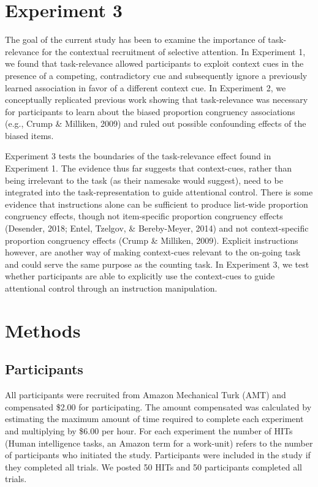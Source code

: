 \documentclass[english,,man,floatsintext]{apa6}
\begin{document}
\hypertarget{experiment-3}{%
\section{Experiment 3}\label{experiment-3}}

The goal of the current study has been to examine the importance of task-relevance for the contextual recruitment of selective attention. In Experiment 1, we found that task-relevance allowed participants to exploit context cues in the presence of a competing, contradictory cue and subsequently ignore a previously learned association in favor of a different context cue. In Experiment 2, we conceptually replicated previous work showing that task-relevance was necessary for participants to learn about the biased proportion congruency associations (e.g., Crump \& Milliken, 2009) and ruled out possible confounding effects of the biased items.

Experiment 3 tests the boundaries of the task-relevance effect found in Experiment 1. The evidence thus far suggests that context-cues, rather than being irrelevant to the task (as their namesake would suggest), need to be integrated into the task-representation to guide attentional control. There is some evidence that instructions alone can be sufficient to produce list-wide proportion congruency effects, though not item-specific proportion congruency effects (Desender, 2018; Entel, Tzelgov, \& Bereby-Meyer, 2014) and not context-specific proportion congruency effects (Crump \& Milliken, 2009). Explicit instructions however, are another way of making context-cues relevant to the on-going task and could serve the same purpose as the counting task. In Experiment 3, we test whether participants are able to explicitly use the context-cues to guide attentional control through an instruction manipulation.

\hypertarget{methods-2}{%
\section{Methods}\label{methods-2}}

\hypertarget{participants-2}{%
\subsection{Participants}\label{participants-2}}

All participants were recruited from Amazon Mechanical Turk (AMT) and compensated \$2.00 for participating. The amount compensated was calculated by estimating the maximum amount of time required to complete each experiment and multiplying by \$6.00 per hour. For each experiment the number of HITs (Human intelligence tasks, an Amazon term for a work-unit) refers to the number of participants who initiated the study. Participants were included in the study if they completed all trials. We posted 50 HITs and 50 participants completed all trials.
\end{document}
